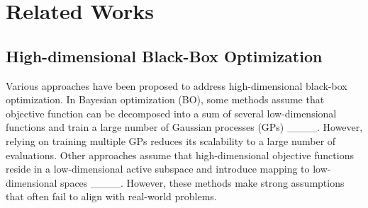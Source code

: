 \section{Related Works}
\subsection{High-dimensional Black-Box Optimization}


 


Various approaches have been proposed to address high-dimensional black-box optimization. In Bayesian optimization (BO), some methods assume that objective function can be decomposed into a sum of several low-dimensional functions and train a large number of Gaussian processes (GPs) ____. However, relying on training multiple GPs reduces its scalability to a large number of evaluations.
Other approaches assume that high-dimensional objective functions reside in a low-dimensional active subspace and introduce mapping to low-dimensional spaces
____. However, these methods make strong assumptions that often fail to align with real-world problems.

